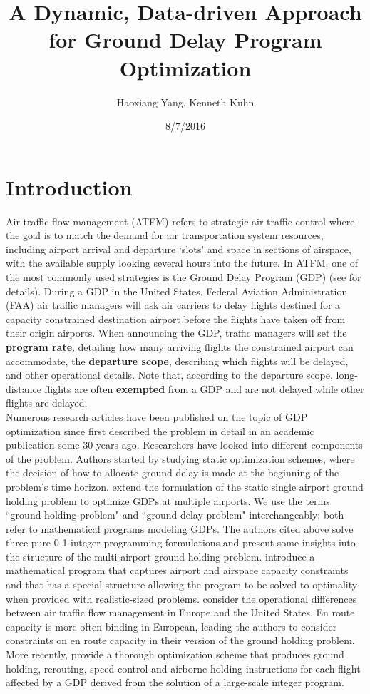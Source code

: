 \documentclass[12pt]{article}
\title{A Dynamic, Data-driven Approach for Ground Delay Program Optimization}
\author{Haoxiang Yang, Kenneth Kuhn}
\date{8/7/2016}
\begin{document}
\maketitle

\section{Introduction} \label{Intro}
	Air traffic flow management (ATFM) refers to strategic air traffic control where the goal is to match the demand for air transportation system resources, including airport arrival and departure `slots' and space in sections of airspace, with the available supply looking several hours into the future.  In ATFM, one of the most commonly used strategies is the Ground Delay Program (GDP) (see \cite{ball2007air} for details).  During a GDP in the United States, Federal Aviation Administration (FAA) air traffic managers will ask air carriers to delay flights destined for a capacity constrained destination airport before the flights have taken off from their origin airports.  When announcing the GDP, traffic managers will set the {\bf program rate}, detailing how many arriving flights the constrained airport can accommodate, the {\bf departure scope}, describing which flights will be delayed, and other operational details.  Note that, according to the departure scope, long-distance flights are often {\bf exempted} from a GDP and are not delayed while other flights are delayed.\\
	\newline
	Numerous research articles have been published on the topic of GDP optimization since \cite{odoni} first described the problem in detail in an academic publication some 30 years ago. Researchers have looked into different components of the problem. Authors started by studying static optimization schemes, where the decision of how to allocate ground delay is made at the beginning of the problem's time horizon.  \cite{vranas1994multi} extend the formulation of the static single airport ground holding problem to optimize GDPs at multiple airports. We use the terms ``ground holding problem" and ``ground delay problem" interchangeably; both refer to mathematical programs modeling GDPs. The authors cited above solve three pure 0-1 integer programming formulations and present some insights into the structure of the multi-airport ground holding problem. \cite{ssp} introduce a mathematical program that captures airport and airspace capacity constraints and that has a special structure allowing the program to be solved to optimality when provided with realistic-sized problems.  \cite{lulli2007european} consider the operational differences between air traffic flow management in Europe and the United States. En route capacity is more often binding in European, leading the authors to consider constraints on en route capacity in their version of the ground holding problem. More recently, \cite{bertsimas2011integer} provide a thorough optimization scheme that produces ground holding, rerouting, speed control and airborne holding instructions for each flight affected by a GDP derived from the solution of a large-scale integer program.\\
\end{document}
